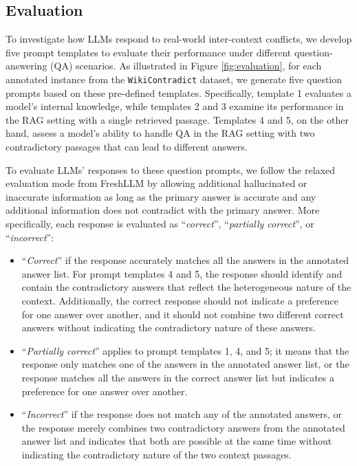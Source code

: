 \subsection{Evaluation}
\label{sec:evalProtocal}
To investigate how LLMs respond to real-world inter-context conflicts, we develop five prompt templates to evaluate their performance under different question-answering (QA) scenarios.  As illustrated in Figure \ref{fig:evaluation}, for each annotated instance from the \texttt{WikiContradict} dataset, we generate five question prompts based on these pre-defined templates. Specifically, template 1 evaluates a model's internal knowledge, while templates 2 and 3 examine its performance in the RAG setting with a single retrieved passage. Templates 4 and 5, on the other hand, assess a model's ability to handle QA in the RAG setting with two contradictory passages that can lead to different answers.

To evaluate LLMs' responses to these question prompts, we follow the relaxed evaluation mode from FreshLLM \citep{vu2023freshllms} by allowing additional hallucinated or inaccurate information as long as the primary answer is accurate and any additional information does not contradict with the primary answer. More specifically, each response is evaluated as ``\emph{correct}'', ``\emph{partially correct}'', or ``\emph{incorrect}'':
\begin{itemize}
    \item ``\emph{Correct}'' if the response accurately matches all the answers in the annotated answer list. For prompt templates 4 and 5, the response should identify and contain the contradictory answers that reflect the heterogeneous nature of the context. Additionally, the correct response should not indicate a preference for one answer over another, and it should not combine two different correct answers without indicating the contradictory nature of these answers.
    \item ``\emph{Partially correct}'' applies to prompt templates 1, 4, and 5; it means that the response only matches one of the answers in the annotated answer list, or the response matches all the answers in the correct answer list but indicates a preference for one answer over another.
    \item ``\emph{Incorrect}'' if the response does not match any of the annotated answers, or the response merely combines two contradictory answers from the annotated answer list and indicates that both are possible at the same time without indicating the contradictory nature of the two context passages.
\end{itemize}
  
